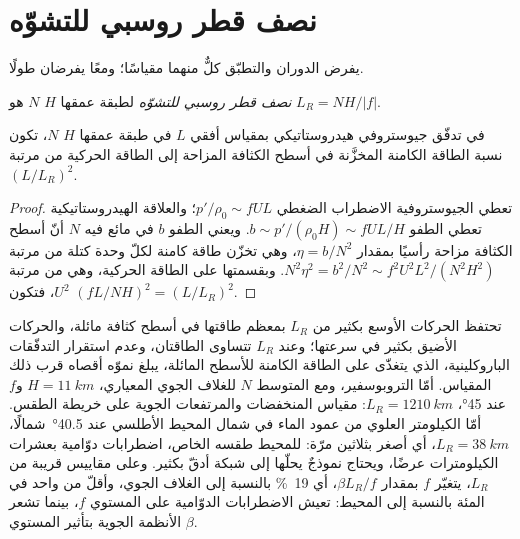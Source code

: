 \section{نصف قطر روسبي للتشوّه}\label{sec:b3:gfd-foundations:rossby-radius}

يفرض الدوران والتطبّق كلٌّ منهما مقياسًا؛ ومعًا يفرضان
طولًا.

\begin{definition}\label{def:b3:gfd-foundations:rossby-radius}
\emph{نصف قطر روسبي للتشوّه}
لطبقة عمقها $H$  $N$ هو $L_R = NH/|f|$.
\end{definition}

\begin{proposition}\label{prop:b3:gfd-foundations:rossby-radius}
في تدفّق جيوستروفي هيدروستاتيكي بمقياس أفقي $L$ في طبقة
عمقها $H$  $N$، تكون نسبة الطاقة الكامنة
المخزَّنة في أسطح الكثافة المزاحة إلى الطاقة الحركية من مرتبة
$(L/L_R)^2$.
\end{proposition}

\begin{proof}
تعطي الجيوستروفية الاضطراب الضغطي $p'/\rho_0 \sim fUL$؛ والعلاقة
الهيدروستاتيكية تعطي الطفو $b \sim p'/(\rho_0H) \sim fUL/H$. ويعني
الطفو $b$ في مائع  فيه $N$ أنّ أسطح الكثافة مزاحة رأسيًا
بمقدار $\eta = b/N^2$، وهي تخزّن طاقة كامنة لكلّ وحدة كتلة من مرتبة
$N^2\eta^2 = b^2/N^2 \sim f^2U^2L^2/(N^2H^2)$. وبقسمتها
على الطاقة الحركية، وهي من مرتبة $U^2$، فتكون $(fL/NH)^2 = (L/L_R)^2$.
\end{proof}

تحتفظ الحركات الأوسع بكثير من $L_R$ بمعظم طاقتها في أسطح كثافة مائلة،
والحركات الأضيق بكثير في سرعتها؛ وعند $L_R$ تتساوى الطاقتان،
وعدم استقرار التدفّقات الباروكلينية، الذي يتغذّى على
الطاقة الكامنة للأسطح المائلة، يبلغ نموّه أقصاه قرب ذلك المقياس. أمّا
التروبوسفير، ومع المتوسط $N$ للغلاف الجوي المعياري، $H =
\qty{11}{km}$ و$f$ عند \ang{45}، $L_R = \qty{1210}{km}$: مقياس
المنخفضات والمرتفعات الجوية على خريطة الطقس. أمّا الكيلومتر العلوي من
عمود الماء في شمال المحيط الأطلسي عند \ang{40.5}~شمالًا، $L_R = \qty{38}{km}$، أي أصغر بثلاثين
مرّة: للمحيط طقسه الخاص، اضطرابات دوّامية بعشرات الكيلومترات
عرضًا، ويحتاج نموذجٌ يحلّها إلى شبكة أدقّ بكثير. وعلى مقاييس
قريبة من $L_R$، يتغيّر $f$ بمقدار $\beta L_R/f$، أي \qty{19}{\percent} بالنسبة إلى
الغلاف الجوي، وأقلّ من واحد في المئة بالنسبة إلى المحيط: تعيش الاضطرابات الدوّامية على
المستوي $f$، بينما تشعر الأنظمة الجوية بتأثير المستوي $\beta$.

